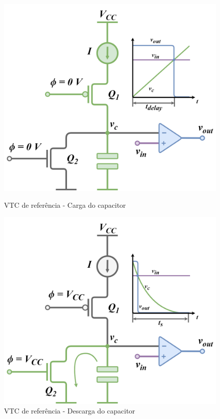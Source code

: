 \documentclass[
	12pt,				%
	openright,			%
	twoside,			%
	a4paper,			%
	english,			%
	french,				%
	spanish,			%
	brazil,				%
	]{abntex2}
\begin{document}
			\begin{figure}[h]
				\centering
				\begin{minipage}{0.4\linewidth}
					\centering
					\includegraphics[width = \linewidth]{images/VTC2_charge.png}
					\caption{VTC de referência - Carga do capacitor}
					\label{vtc2_charge}
				\end{minipage}
				\hfill\vline\hfill
				\begin{minipage}{0.4\linewidth}
					\centering
					\includegraphics[width = \linewidth]{images/VTC2_discharge.png}
					\caption{VTC de referência - Descarga do capacitor}
					\label{vtc2_discharge}
				\end{minipage}
			\end{figure}
\end{document}
